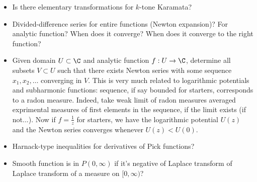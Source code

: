 \begin{itemize}
	\item Is there elementary transformations for $k$-tone Karamata?
	\item Divided-difference series for entire functions (Newton expansion)? For analytic function? When does it converge? When does it converge to the right function?
	\item Given domain $U \subset \C$ and analytic function $f : U \to \C$, determine all subsets $V \subset U$ such that there exists Newton series with some sequence $x_{1}, x_{2}, \ldots$ converging in $V$. This is very much related to logarithmic potentials and subharmonic functions: sequence, if say bounded for starters, corresponds to a radon measure. Indeed, take weak limit of radon measures averaged exprimental measures of first elements in the sequence, if the limit exists (if not...). Now if $f = \frac{1}{z}$ for starters, we have the logarithmic potential $U(z)$ and the Newton series converges whenever $U(z) < U(0)$.
	\item Harnack-type inequalities for derivatives of Pick functions?
	\item Smooth function is in $P(0, \infty)$ if it's negative of Laplace transform of Laplace transform of a measure on $[0, \infty)$?
\end{itemize}
